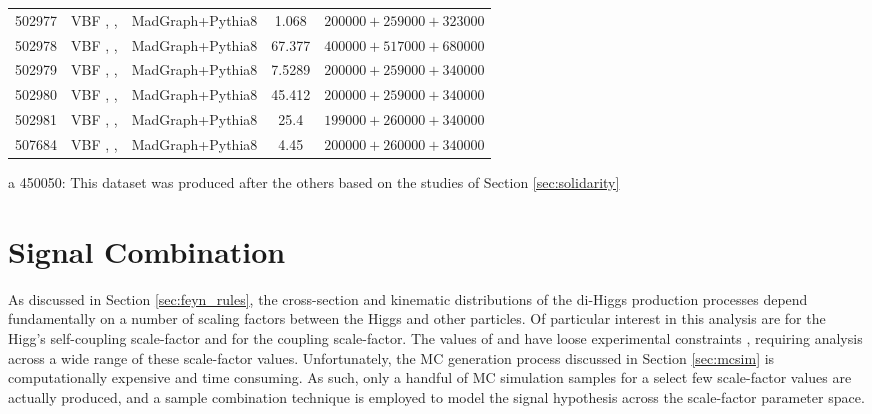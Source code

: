 \begin{table}[tbh]
\begin{center}
\begin{tabular}{l l l S l}
               502977  &	VBF , ,     &  MadGraph+Pythia8 &	1.068   & $200000  +259000  +323000  $\\
               502978  &	VBF , ,    &  MadGraph+Pythia8 &	67.377  & $400000  +517000  +680000  $\\
               502979  &	VBF , ,   &  MadGraph+Pythia8 &	7.5289  & $200000  +259000  +340000  $\\
               502980  &	VBF , ,   &  MadGraph+Pythia8 &	45.412  & $200000  +259000  +340000  $\\
               502981  &	VBF , ,     &  MadGraph+Pythia8 &	25.4    & $199000  +260000  +340000  $\\
               507684  &	VBF , ,  &  MadGraph+Pythia8 &	4.45    & $200000  +260000  +340000  $\\
           \hline
           \end{tabular}
           \begin{tablenotes}
            \item[a] 450050: This dataset was produced after the others based on the studies of Section \ref{sec:solidarity}
          \end{tablenotes}
       \end{center}
    \end{table}



\FloatBarrier
\section{Signal Combination} \label{sec:signal_combination}

    As discussed in Section \ref{sec:feyn_rules},
        the cross-section and kinematic distributions of the di-Higgs production processes
        depend fundamentally on a number of scaling factors between the Higgs and other particles.
    Of particular interest in this analysis are \kl for the Higg's self-coupling scale-factor and \kvv for the \HHVV coupling scale-factor.
    The values of \kl and \kvv have loose experimental constraints \cite{EXOT-2016-31} \cite{HDBS-2018-18-witherratum} \cite{ATLAS-CONF-2019-049},
        requiring analysis across a wide range of these scale-factor values.
    Unfortunately, the MC generation process discussed in Section \ref{sec:mcsim} is computationally expensive and time consuming.
    As such, only a handful of MC simulation samples for a select few scale-factor values are actually produced,
        and a sample combination technique is employed to model the signal hypothesis across the scale-factor parameter space.

